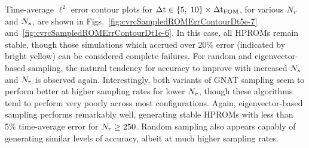 Time-average $\ell^2$ error contour plots for $\Delta \text{t} \in \{5, \; 10\} \times \Delta \text{t}_{\text{FOM}}$, for various $N_r$ and $N_s$, are shown in Figs.~\ref{fig:cvrcSampledROMErrContourDt5e-7} and~\ref{fig:cvrcSampledROMErrContourDt1e-6}. In this case, all HPROMs remain stable, though those simulations which accrued over 20\% error (indicated by bright yellow) can be considered complete failures. For random and eigenvector-based sampling, the natural tendency for accuracy to improve with increased $N_s$ and $N_r$ is observed again. Interestingly, both variants of GNAT sampling seem to perform better at higher sampling rates for lower $N_r$, though these algorithms tend to perform very poorly across most configurations. Again, eigenvector-based sampling performs remarkably well, generating stable HPROMs with less than 5\% time-average error for $N_r \ge 250$. Random sampling also appears capably of generating similar levels of accuracy, albeit at much higher sampling rates.


